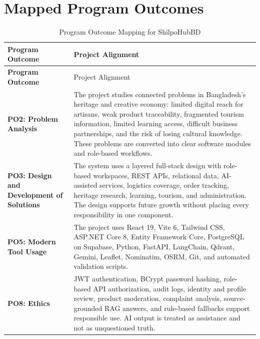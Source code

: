 \documentclass[12pt,a4paper]{report}
\begin{document}
\tableofcontents
\clearpage
\listoffigures
\clearpage

\chapter*{Mapped Program Outcomes}

\begin{longtable}{>{\bfseries}p{}p{}}
\caption{Program Outcome Mapping for ShilpoHubBD}\\
\toprule
Program Outcome & Project Alignment \\
\midrule
\endfirsthead
\toprule
Program Outcome & Project Alignment \\
\midrule
\endhead
PO2: Problem Analysis &
The project studies connected problems in Bangladesh's heritage and creative economy: limited digital reach for artisans, weak product traceability, fragmented tourism information, limited learning access, difficult business partnerships, and the risk of losing cultural knowledge. These problems are converted into clear software modules and role-based workflows. \\

PO3: Design and Development of Solutions &
The system uses a layered full-stack design with role-based workspaces, REST APIs, relational data, AI-assisted services, logistics coverage, order tracking, heritage research, learning, tourism, and administration. The design supports future growth without placing every responsibility in one component. \\

PO5: Modern Tool Usage &
The project uses React 19, Vite 6, Tailwind CSS, ASP.NET Core 8, Entity Framework Core, PostgreSQL on Supabase, Python, FastAPI, LangChain, Qdrant, Gemini, Leaflet, Nominatim, OSRM, Git, and automated validation scripts. \\

PO8: Ethics &
JWT authentication, BCrypt password hashing, role-based API authorization, audit logs, identity and profile review, product moderation, complaint analysis, source-grounded RAG answers, and rule-based fallbacks support responsible use. AI output is treated as assistance and not as unquestioned truth. \\


\end{longtable}
\end{document}
